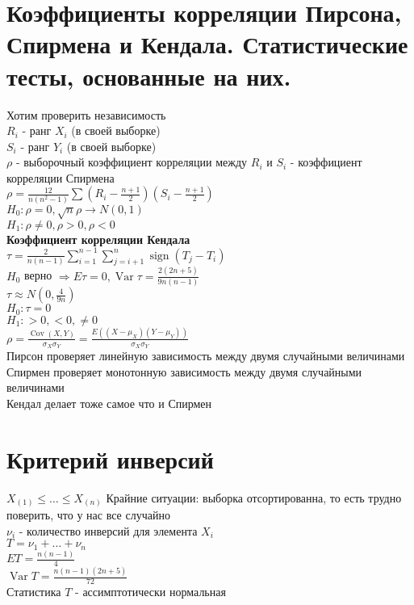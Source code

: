 \documentclass{article}
\newcommand\0{\mathbb{0}}
\DeclareMathOperator{\sign}{sign}
\DeclareMathOperator{\Var}{Var}
\DeclareMathOperator{\Cov}{Cov}
\newcommand\1{\mathbb{1}}
\renewcommand{\bf}{\textbf}
\newcommand{\Rto}{\Rightarrow}
\begin{document}
\section{Коэффициенты корреляции Пирсона, Спирмена и Кендала. Статистические тесты, основанные на них.}
Хотим проверить независимость\\
$R_i$ - ранг $X_i$ (в своей выборке)\\
$S_i$ - ранг $Y_i$ (в своей выборке)\\
$\rho$ - выборочный коэффициент корреляции между $R_i$ и $S_i$ - коэффициент корреляции Спирмена\\
$\rho = \frac{12}{n(n^2 - 1)} \displaystyle\sum (R_i - \frac{n + 1}{2})(S_i - \frac{n + 1}{2})$\\
$H_0: \rho = 0, \sqrt{n}\rho \to N(0, 1)$\\
$H_1: \rho \neq 0, \rho > 0, \rho < 0$\\
\bf{Коэффициент корреляции Кендала}\\
$\tau = \frac{2}{n(n - 1)} \displaystyle\sum_{i = 1}^{n - 1}\displaystyle\sum_{j = i + 1}^{n}\sign(T_j - T_i)$\\
$H_0$ верно $\Rto E\tau = 0, \Var \tau = \frac{2(2n + 5)}{9n(n - 1)}$\\
$\tau \approx N(0, \frac{4}{9n})$\\
$H_0: \tau = 0$\\
$H_1: > 0, < 0, \neq 0$\\
$\rho = \frac{\Cov(X, Y)}{\sigma_X\sigma_Y} = \frac{E((X - \mu_X)(Y - \mu_Y))}{\sigma_X\sigma_Y}$\\
Пирсон проверяет линейную зависимость между двумя случайными величинами\\
Спирмен проверяет монотонную зависимость между двумя случайными величинами\\
Кендал делает тоже самое что и Спирмен\\
\section{Критерий инверсий}
$X_{(1)} \leq \dots \leq X_{(n)}$
Крайние ситуации: выборка отсортированна, то есть трудно поверить, что у нас все случайно\\
$\nu_i$ - количество инверсий для элемента $X_i$\\
$T = \nu_1 + \dots + \nu_{n}$\\
$ET = \frac{n(n - 1)}{4}$\\
$\Var T = \frac{n(n - 1)(2n + 5)}{72}$\\
Статистика $T$ - ассимптотически нормальная\\
\end{document}
